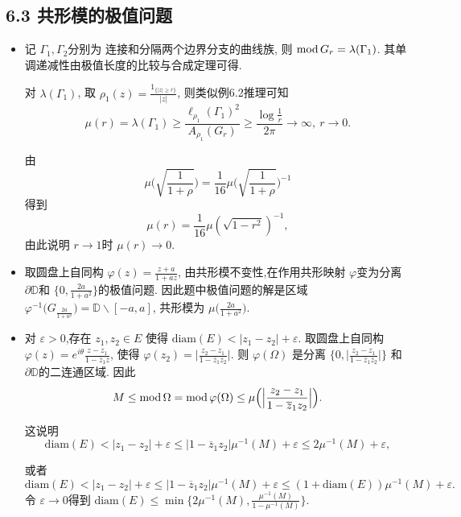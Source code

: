 \subsection*{6.3 共形模的极值问题}
\begin{itemize}
    
    \item[6.3.1] 记 $\Gamma_1,\Gamma_2$分别为 连接和分隔两个边界分支的曲线族,
    则 $\operatorname{mod} G_r = \lambda(\Gamma_1) $. 
    其单调递减性由极值长度的比较与合成定理可得. 
    
    对 $\lambda(\Gamma_1)$, 取 $\rho_1(z)=\frac{1_{\{|z|\ge r\}}}{|z|}$, 
    则类似例6.2推理可知
    $$\mu(r) = \lambda(\Gamma_1)
    \ge \frac{\ell_{\rho_1}(\Gamma_1)^2}{A_{\rho_1}(G_r)}
    \ge \frac{\log \frac{1}{r}}{2\pi}\to \infty,\ r\to 0.$$

   由 $$\mu\Big(\sqrt{\frac{1}{1+\rho}}\Big) 
   = \frac{1}{16}\mu\Big(\sqrt{\frac{1}{1+\rho}}\Big)^{-1}$$
   得到 $$\mu(r) = \frac{1}{16}\mu(\sqrt{1-r^2})^{-1},$$
   由此说明 $r\to 1$时 $\mu(r)\to 0$.

\item[6.3.2] 取圆盘上自同构 $\varphi(z) = \frac{z+a}{1+az}$, 
由共形模不变性,在作用共形映射 $ \varphi$变为分离 
$\partial \mathbb{D}$和 $\big\{0,\frac{2a}{1+a^2}\big\}$的极值问题. 
因此题中极值问题的解是区域 $\varphi^{-1}\big(G_{\frac{2a}{1+a^2}}\big) 
=\mathbb{D}\backslash[-a,a] $, 共形模为  $\mu\big(\frac{2a}{1+a^2}\big)$.

\item[6.3.3] 对 $\varepsilon>0$,存在 $z_1,z_2 \in E$
使得 $\text{diam}(E) < |z_1-z_2|+\varepsilon$. 
取圆盘上自同构 $\varphi(z) = e^{i\theta}\frac{z-z_1}{1-\overline{z}_1z}$, 
使得 $\varphi(z_2) = \big|\frac{z_2-z_1}{1-\overline{z}_1z_2}\big|$. 
则 $\varphi(\Omega)$ 是分离 $\{0, \big|\frac{z_2-z_1}{1-\overline{z}_1z_2}\big|\}$ 
和 $\partial \mathbb{D}$的二连通区域. 因此
 $$M\le \operatorname{mod}\Omega = \operatorname{mod}\varphi(\Omega) 
 \le \mu\Big( \Big|\frac{z_2-z_1}{1-\overline{z}_1z_2}\Big|\Big).$$

 这说明
 $$\text{diam}(E) < |z_1-z_2|+\varepsilon
 \le |1-\overline{z}_1z_2| \mu^{-1}(M)+\varepsilon\le 2\mu^{-1}(M)+\varepsilon,$$

 或者 
 $$\text{diam}(E) < |z_1-z_2|+\varepsilon
 \le |1-\overline{z}_1z_2| \mu^{-1}(M)+\varepsilon\le (1+\text{diam}(E))\mu^{-1}(M)+\varepsilon .$$
 令 $\varepsilon\to 0$得到 $\text{diam}(E)\le \min\{ 2\mu^{-1}(M), 
 \frac{\mu^{-1}(M)}{1-\mu^{-1}(M)}\}$.


\end{itemize}
